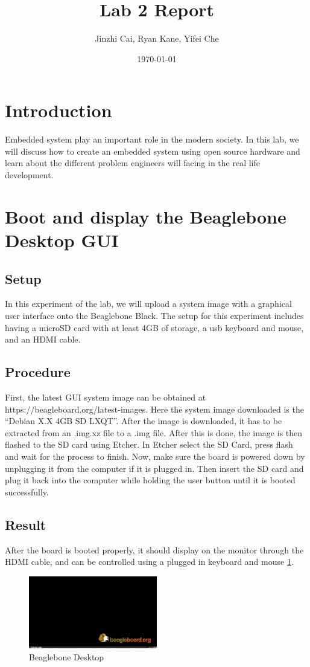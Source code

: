 \documentclass{article}
\title{Lab 2 Report}
\author{Jinzhi Cai, Ryan Kane, Yifei Che}
\date{\today}
\begin{document}
	\maketitle
	\newpage
	\tableofcontents
	\clearpage
	\section{Introduction}
	Embedded system play an important role in the modern society. In this lab, we will discuss how to create an embedded system using open source hardware and learn about the different problem engineers will facing in the real life development.
	\section{Boot and display the Beaglebone Desktop GUI}
	\subsection{Setup}
	In this experiment of the lab, we will upload a system image with a graphical user interface onto the Beaglebone Black. The setup for this experiment includes having a microSD card with at least 4GB of storage, a usb keyboard and mouse, and an HDMI cable.
	
	\subsection{Procedure}
	First, the latest GUI system image can be obtained at https://beagleboard.org/latest-images. Here the system image downloaded is the “Debian X.X 4GB SD LXQT”. After the image is downloaded, it has to be extracted from an .img.xz file to a .img file. After this is done, the image is then flashed to the SD card using Etcher. In Etcher select the SD Card, press flash and wait for the process to finish. Now, make sure the board is powered down by unplugging it from the computer if it is plugged in. Then insert the SD card and plug it back into the computer while holding the user button until it is booted successfully. 
	
	
	\subsection{Result}
	After the board is booted properly, it should display on the monitor through the HDMI cable, and can be controlled using a plugged in keyboard and mouse \ref{BBD}. 
	
	\begin{figure}[hb]
		\centering
		\includegraphics[width=0.5\textwidth]{img/Lab2_beaglebone_DP.jpg}
		\caption{Beaglebone Desktop} 
		\label{BBD}
	\end{figure}
	\clearpage
\end{document}
